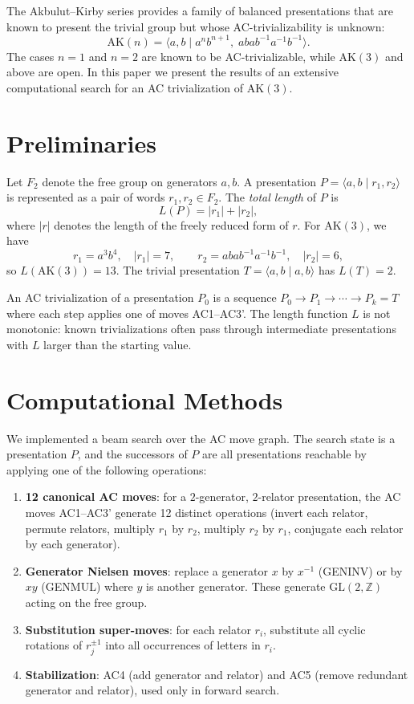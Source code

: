 \documentclass[12pt,a4paper]{article}
\begin{document}
The Akbulut--Kirby series \cite{akbulut1985potential} provides a family of balanced presentations that are known to present the trivial group but whose AC-trivializability is unknown:
\[
\text{AK}(n) = \langle a,b \mid a^n b^{n+1},\; a b a b^{-1} a^{-1} b^{-1} \rangle.
\]
The cases $n=1$ and $n=2$ are known to be AC-trivializable, while $\text{AK}(3)$ and above are open. In this paper we present the results of an extensive computational search for an AC trivialization of $\text{AK}(3)$.

\section{Preliminaries}

Let $F_2$ denote the free group on generators $a,b$. A presentation $P = \langle a,b \mid r_1, r_2 \rangle$ is represented as a pair of words $r_1, r_2 \in F_2$. The \emph{total length} of $P$ is
\[
L(P) = |r_1| + |r_2|,
\]
where $|r|$ denotes the length of the freely reduced form of $r$. For $\text{AK}(3)$, we have
\[
r_1 = a^3 b^4,\quad |r_1| = 7,\qquad
r_2 = a b a b^{-1} a^{-1} b^{-1},\quad |r_2| = 6,
\]
so $L(\text{AK}(3)) = 13$. The trivial presentation $T = \langle a,b \mid a,b \rangle$ has $L(T) = 2$.

An AC trivialization of a presentation $P_0$ is a sequence $P_0 \rightarrow P_1 \rightarrow \cdots \rightarrow P_k = T$ where each step applies one of moves AC1--AC3'. The length function $L$ is not monotonic: known trivializations often pass through intermediate presentations with $L$ larger than the starting value.

\section{Computational Methods}

We implemented a beam search over the AC move graph. The search state is a presentation $P$, and the successors of $P$ are all presentations reachable by applying one of the following operations:

\begin{enumerate}
  \item \textbf{12 canonical AC moves}: for a $2$-generator, $2$-relator presentation, the AC moves AC1--AC3' generate 12 distinct operations (invert each relator, permute relators, multiply $r_1$ by $r_2$, multiply $r_2$ by $r_1$, conjugate each relator by each generator).
  \item \textbf{Generator Nielsen moves}: replace a generator $x$ by $x^{-1}$ (GENINV) or by $xy$ (GENMUL) where $y$ is another generator. These generate $\text{GL}(2,\mathbb{Z})$ acting on the free group.
  \item \textbf{Substitution super-moves}: for each relator $r_i$, substitute all cyclic rotations of $r_j^{\pm 1}$ into all occurrences of letters in $r_i$.
  \item \textbf{Stabilization}: AC4 (add generator and relator) and AC5 (remove redundant generator and relator), used only in forward search.
\end{enumerate}
\end{document}
